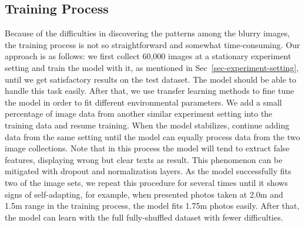 \subsection{Training Process}
Because of the difficulties in discovering the patterns among the blurry images, the training process is not so straightforward and somewhat time-consuming. Our approach is as follows: we first collect 60,000 images at a stationary experiment setting and train the model with it, as mentioned in Sec~\ref{sec-experiment-setting}, until we get satisfactory results on the test dataset. The model should be able to handle this task easily. After that, we use transfer learning methods to fine tune the model in order to fit different environmental parameters. We add a small percentage of image data from another similar experiment setting into the training data and resume training. When the model stabilizes, continue adding data from the same setting until the model can equally process data from the two image collections. Note that in this process the model will tend to extract false features, displaying wrong but clear texts as result. This phenomenon can be mitigated with dropout and normalization layers. As the model successfully fits two of the image sets, we repeat this procedure for several times until it shows signs of self-adapting, for example, when presented photos taken at 2.0m and 1.5m range in the training process, the model fits 1.75m photos easily. After that, the model can learn with the full fully-shuffled dataset with fewer difficulties.
